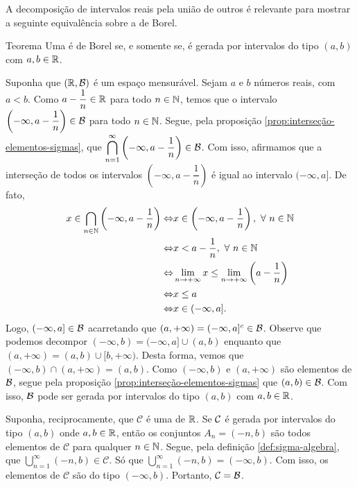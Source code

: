 A decomposição de intervalos reais pela união de outros é relevante para mostrar a seguinte equivalência sobre a \sigal de Borel.\\
\begin{resultado}{Teorema}
\label{teo:equiv-borel}
    Uma \sigal é de Borel  se, e somente se, é gerada por intervalos do tipo $(a,b)$ com $a,b \in \mathbb{R}$.
\end{resultado}

\begin{prova}
   Suponha que $(\mathbb{R},\operatorname{\mathcal{B}})$ é um espaço mensurável. 
   Sejam $a$ e $b$ números reais, com $a<b$.
   Como $a - \dfrac{1}{n} \in \mathbb{R}$ para todo $n \in \operatorname{\mathbb{N}}$, temos que o intervalo
   $\left(-\infty, a- \dfrac{1}{n}\right) \in \operatorname{\mathcal{B}}$ para todo $n \in \operatorname{\mathbb{N}}$.
   Segue, pela proposição \ref{prop:interseção-elementos-sigmas}, que
   $\displaystyle \bigcap_{n = 1}^\infty \left(-\infty, a- \dfrac{1}{n}\right) \in \operatorname{\mathcal{B}}$.
   Com isso, afirmamos que a interseção de todos os intervalos $\left(-\infty, a - \dfrac{1}{n}\right)$ é igual ao intervalo $(-\infty, a]$.
   De fato,
   \begin{align*}
   		x \in \bigcap_{n \in \operatorname{\mathbb{N}}} \left(-\infty, a - \dfrac{1}{n}\right)
   		\Leftrightarrow & x \in \left(-\infty, a - \dfrac{1}{n}\right), \ \forall \ n \in \operatorname{\mathbb{N}}\\
   		\Leftrightarrow & x < a - \dfrac{1}{n}, \ \forall \ n \in \operatorname{\mathbb{N}}\\
   		\Leftrightarrow & \displaystyle \lim_{n \to +\infty} x \leq \displaystyle \lim_{n \to +\infty} \left(a - \dfrac{1}{n}\right)\\
   		\Leftrightarrow & x \leq a\\
   		\Leftrightarrow & x \in (-\infty, a].
   \end{align*}
	Logo, $(-\infty, a] \in \operatorname{\mathcal{B}}$ acarretando que $(a, +\infty) = (-\infty, a]^c \in \operatorname{\mathcal{B}}$.
	Observe que podemos decompor $(-\infty, b) = (-\infty,a] \cup (a, b)$ enquanto que $(a, +\infty) = (a, b) \cup [b, +\infty)$.
	Desta forma, vemos que $(-\infty, b) \cap (a, +\infty) = (a,b)$. 
	Como $(-\infty, b)$ e $(a, +\infty)$ são elementos de $\operatorname{\mathcal{B}}$, segue pela proposição
	\ref{prop:interseção-elementos-sigmas} que $(a,b) \in \operatorname{\mathcal{B}}$.
	Com isso, $\operatorname{\mathcal{B}}$ pode ser gerada por intervalos do tipo $(a,b)$ com $a,b \in \mathbb{R}$.
   
	Suponha, reciprocamente, que $\mathcal{C}$ é uma \sigal de $\mathbb{R}$.
	Se $\operatorname{\mathcal{C}}$ é gerada por intervalos do tipo $(a,b)$ onde $a,b \in \mathbb{R}$, então
	os conjuntos $A_n = (-n, b)$ são todos elementos de $\mathcal{C}$ para qualquer $n \in \operatorname{\mathbb{N}}$.
	Segue, pela definição \ref{def:sigma-algebra}, que 
	$\displaystyle \bigcup_{n = 1}^\infty (-n,b) \in \mathcal{C}$.
	Só que $\displaystyle \bigcup_{n = 1}^\infty (-n,b) = (-\infty, b)$.
	Com isso, os elementos de $\mathcal{C}$ são do tipo $(-\infty, b)$.
	Portanto, $\mathcal{C} = \operatorname{\mathcal{B}}$.

\end{prova}

